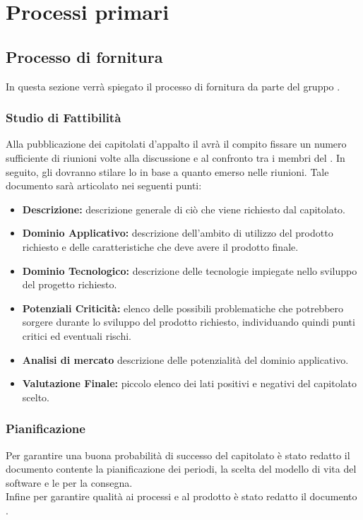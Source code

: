 \section{Processi primari}
\subsection{Processo di fornitura}
In questa sezione verrà spiegato il processo di fornitura da parte del gruppo \gruppo.

\subsubsection{Studio di Fattibilità}
Alla pubblicazione dei capitolati d'appalto il \textit{\Pm} avrà il compito fissare un
numero sufficiente di riunioni volte alla discussione e al confronto tra i membri del .
In seguito, gli \textit{\AnP} dovranno stilare lo \textit{\SdF} in base a quanto
emerso nelle riunioni. Tale documento sarà articolato nei seguenti punti:
\begin{itemize}
	\item \textbf{Descrizione:} descrizione generale di ciò che viene richiesto
	dal capitolato.
	\item \textbf{Dominio Applicativo:} descrizione dell'ambito di utilizzo del
	prodotto richiesto e delle caratteristiche che deve avere il prodotto finale.
	\item \textbf{Dominio Tecnologico:} descrizione delle tecnologie impiegate
	nello sviluppo del progetto richiesto.
	\item \textbf{Potenziali Criticità:} elenco delle possibili problematiche che potrebbero
	sorgere durante lo sviluppo del prodotto richiesto, individuando quindi punti
	critici ed eventuali rischi.
	\item \textbf{Analisi di mercato} descrizione delle potenzialità del dominio applicativo.
	\item \textbf{Valutazione Finale:} piccolo elenco dei lati positivi e negativi del capitolato scelto.
\end{itemize}

\subsubsection{Pianificazione}
Per garantire una buona probabilità di successo del capitolato è stato redatto il documento \PdP contente la pianificazione dei periodi, la scelta del modello di vita del software e le  per la consegna. \\
Infine per garantire qualità ai processi e al prodotto è stato redatto il documento \PdQ.


